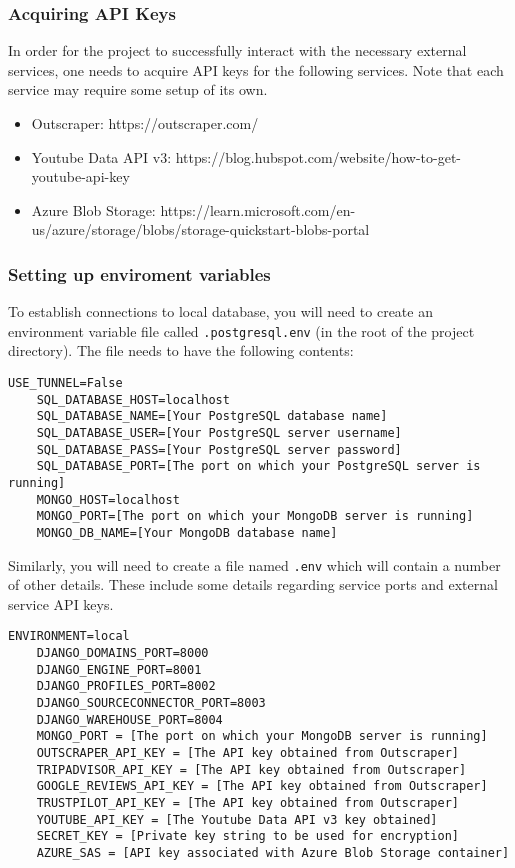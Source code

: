 \documentclass{article}
\newcommand{\code}[1]{\colorbox{light-gray}{\texttt{#1}}}
\begin{document}
\subsubsection{Acquiring API Keys}
In order for the project to successfully interact with the necessary external services, one needs to acquire API keys for the following services.
Note that each service may require some setup of its own.
\begin{itemize}
    \item Outscraper: https://outscraper.com/
    \item Youtube Data API v3: https://blog.hubspot.com/website/how-to-get-youtube-api-key
    \item Azure Blob Storage: https://learn.microsoft.com/en-us/azure/storage/blobs/storage-quickstart-blobs-portal
\end{itemize}


\subsubsection{Setting up enviroment variables}
To establish connections to local database, you will need to create an environment variable file called \code{.postgresql.env} (in the root of the project directory). The file
needs to have the following contents:
\begin{lstlisting}[basicstyle=\ttfamily]
    USE_TUNNEL=False
    SQL_DATABASE_HOST=localhost
    SQL_DATABASE_NAME=[Your PostgreSQL database name]
    SQL_DATABASE_USER=[Your PostgreSQL server username]
    SQL_DATABASE_PASS=[Your PostgreSQL server password]
    SQL_DATABASE_PORT=[The port on which your PostgreSQL server is running]
    MONGO_HOST=localhost
    MONGO_PORT=[The port on which your MongoDB server is running]
    MONGO_DB_NAME=[Your MongoDB database name]
\end{lstlisting}

Similarly, you will need to create a file named \code{.env} which will contain a number of other details. These include some details
regarding service ports and external service API keys.
\begin{lstlisting}[basicstyle=\ttfamily]
    ENVIRONMENT=local
    DJANGO_DOMAINS_PORT=8000
    DJANGO_ENGINE_PORT=8001
    DJANGO_PROFILES_PORT=8002
    DJANGO_SOURCECONNECTOR_PORT=8003
    DJANGO_WAREHOUSE_PORT=8004
    MONGO_PORT = [The port on which your MongoDB server is running]
    OUTSCRAPER_API_KEY = [The API key obtained from Outscraper]
    TRIPADVISOR_API_KEY = [The API key obtained from Outscraper]
    GOOGLE_REVIEWS_API_KEY = [The API key obtained from Outscraper]
    TRUSTPILOT_API_KEY = [The API key obtained from Outscraper]
    YOUTUBE_API_KEY = [The Youtube Data API v3 key obtained]
    SECRET_KEY = [Private key string to be used for encryption]
    AZURE_SAS = [API key associated with Azure Blob Storage container]
\end{lstlisting}
\end{document}
